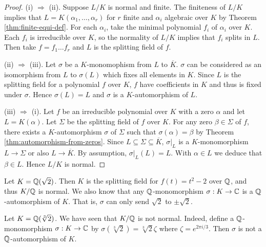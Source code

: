 \begin{proof}
    (i) $\Rightarrow$ (ii). 
    Suppose $L/K$ is normal and finite. The finiteness of $L/K$ implies that $L = K(\alpha_1, \dots, \alpha_r)$ for $r$ finite and $\alpha_i$ algebraic over $K$ by Theorem \ref{thm:finite-equi-def}. For each $\alpha_i$, take the minimal polynomial $f_i$ of $\alpha_i$ over $K$. Each $f_i$ is irreducible over $K$, so the normality of $L/K$ implies that $f_i$ splits in $L$.  Then take $f = f_1 \dots f_r$ and $L$ is the splitting field of $f$.
	
    

    (ii) $\Rightarrow$ (iii). Let $\sigma$ be a $K$-monomophism from $L$ to $\overline K$. $\sigma$ can be considered as an isomorphism from $L$ to $\sigma(L)$ which fixes all elements in $K$. Since $L$ is the splitting field for a polynomial $f$ over $K$, $f$ have coefficients in $K$ and thus is fixed under $\sigma$. Hence $\sigma(L) = L$ and $\sigma$ is a $K$-automorphism of $L$. 
    
    (iii) $\Rightarrow$ (i). Let $f$ be an irreducible polynomial over $K$ with a zero $\alpha$ and let $L = K(\alpha)$. Let $\Sigma$ be the splitting field of $f$ over $K$. For any zero $\beta \in \Sigma$ of $f$, there exists a $K$-automorphism $\sigma$ of $\Sigma $ such that $\sigma(\alpha) = \beta$ by Theorem \ref{thm:automorphism-from-zeros}. Since $L \subseteq \Sigma \subseteq \overline K$, $\sigma | _ L$ is a $K$-monomorphism $L \to \Sigma$ or also $L \to \overline K$. By assumption, $\sigma|_L(L) = L$. With $\alpha \in L$ we deduce that $\beta \in L$. Hence $L/K$ is normal.
\end{proof}

\begin{example}
	Let $K = \mathbb Q (\sqrt 2)$. Then $K$ is the splitting field for $f(t) = t^2 - 2$ over $\mathbb Q$, and thus $K/ \mathbb Q$ is normal. We also know that any $\mathbb Q$-monomorphism $\sigma: K \to \mathbb C$ is a $\mathbb Q$-automorphism of $K$. That is, $\sigma$ can only send $\sqrt 2$ to $\pm \sqrt 2$. 
\end{example}

\begin{example}
	Let $K = \mathbb Q(\sqrt[3]{2})$. We have seen that $K / \mathbb Q$ is not normal. Indeed, define a $\mathbb Q$-monomorphism $\sigma : K \to \mathbb C$ by $\sigma(\sqrt[3]{2}) =  \sqrt[3]{2}\zeta $ where $\zeta = e^{2 \pi i / 3}$. Then $\sigma$ is not a $\mathbb Q$-automorphism of $K$. 
\end{example}


